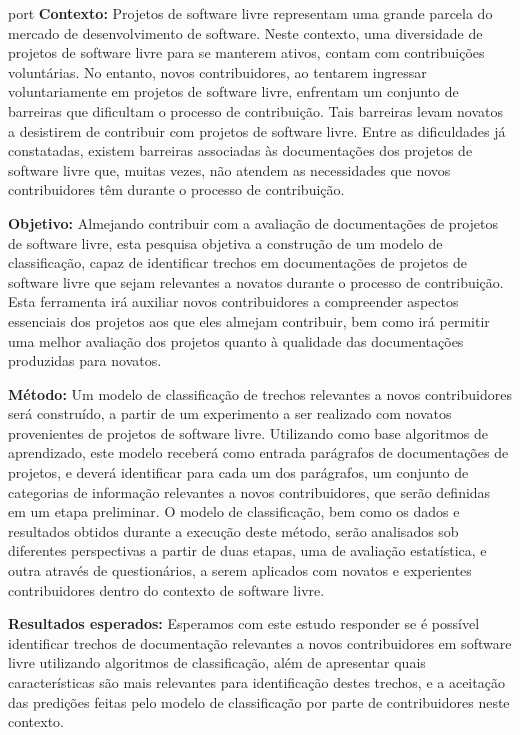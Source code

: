 \begin{resumo}{port}
\textbf{Contexto:} Projetos de software livre representam uma grande parcela do mercado de desenvolvimento de software. Neste contexto, uma diversidade de projetos de software livre para se manterem ativos, contam com contribuições voluntárias. No entanto, novos contribuidores, ao tentarem ingressar voluntariamente em projetos de software livre, enfrentam um conjunto de barreiras que dificultam o processo de contribuição. Tais barreiras levam novatos a desistirem de contribuir com projetos de software livre. Entre as dificuldades já constatadas, existem barreiras associadas às documentações dos projetos de software livre que, muitas vezes, não atendem as necessidades que novos contribuidores têm durante o processo de contribuição.

\textbf{Objetivo:} Almejando contribuir com a avaliação de documentações de projetos de software livre, esta pesquisa objetiva a construção de um modelo de classificação, capaz de identificar trechos em documentações de projetos de software livre que sejam relevantes a novatos durante o processo de contribuição. Esta ferramenta irá auxiliar novos contribuidores a compreender aspectos essenciais dos projetos aos que eles almejam contribuir, bem como irá permitir uma melhor avaliação dos projetos quanto à qualidade das documentações produzidas para novatos. 

\textbf{Método:} Um modelo de classificação de trechos relevantes a novos contribuidores será construído, a partir de um experimento a ser realizado com novatos provenientes de projetos de software livre. Utilizando como base algoritmos de aprendizado, este modelo receberá como entrada parágrafos de documentações de projetos, e deverá identificar para cada um dos parágrafos, um conjunto de categorias de informação relevantes a novos contribuidores, que serão definidas em um etapa preliminar. O modelo de classificação, bem como os dados e resultados obtidos durante a execução deste método, serão analisados sob diferentes perspectivas a partir de duas etapas, uma de avaliação estatística, e outra através de questionários, a serem aplicados com novatos e experientes contribuidores dentro do contexto de software livre. 

\textbf{Resultados esperados:} Esperamos com este estudo responder se é possível identificar trechos de documentação relevantes a novos contribuidores em software livre utilizando algoritmos de classificação, além de apresentar quais características são mais relevantes para identificação destes trechos, e a aceitação das predições feitas pelo modelo de classificação por parte de contribuidores neste contexto.
\end{resumo}

